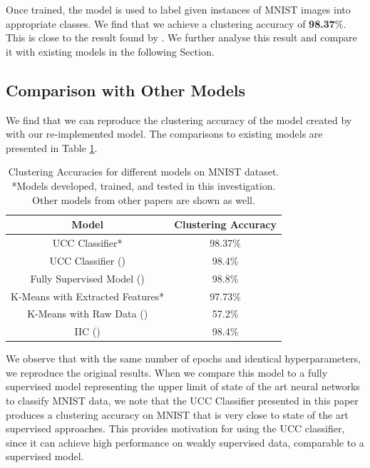 \documentclass{article} %
\begin{document}
Once trained, the model is used to label given instances of MNIST images into appropriate classes. We find that we achieve a clustering accuracy of \textbf{98.37$\%$}. This is close to the result found by \cite{Oner2019}. We further analyse this result and compare it with existing models in the following Section.

\subsection{Comparison with Other Models} %
We find that we can reproduce the clustering accuracy of the model created by \cite{Oner2019} with our re-implemented model. The comparisons to existing models are presented in Table \ref{tab:results}.

\begin{table}[H]
\centering
\caption{Clustering Accuracies for different models on MNIST dataset. *Models developed, trained, and tested in this investigation. Other models from other papers are shown as well.}
\vspace{0.3cm}
\label{tab:results}
\begin{tabular}{|c|c|}
\hline
\textbf{Model}                              & \textbf{Clustering Accuracy} \\ \hline
UCC Classifier*                             & 98.37\%                      \\ \hline
UCC Classifier (\cite{Oner2019})            & 98.4\%                       \\ \hline
Fully Supervised Model (\cite{Oner2019})    & 98.8\%                       \\ \hline
K-Means with Extracted Features*            & 97.73\%                      \\ \hline
K-Means with Raw Data (\cite{wang2014optimized})      & 57.2\%                       \\ \hline
IIC (\cite{ji2019invariant})                   & 98.4\%                       \\ \hline
\end{tabular}
\end{table}

We observe that with the same number of epochs and identical hyperparameters, we reproduce the original results. When we compare this model to a fully supervised model representing the upper limit of state of the art neural networks to classify MNIST data, we note that the UCC Classifier presented in this paper produces a clustering accuracy on MNIST that is very close to state of the art supervised approaches. This provides motivation for using the UCC classifier, since it can achieve high performance on weakly supervised data, comparable to a supervised model.
\end{document}
